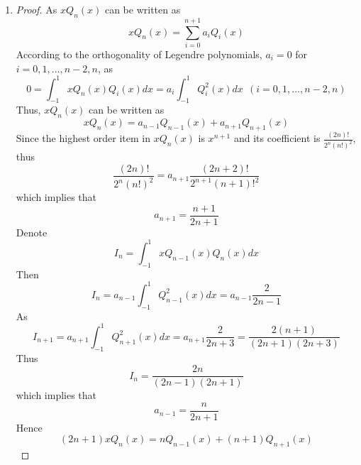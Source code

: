 \documentclass[paper=a4, fontsize=11pt]{scrartcl} %
\numberwithin{equation}{section} %
\numberwithin{figure}{section} %
\numberwithin{table}{section} %
\begin{document}
\begin{enumerate}
		\item
			\begin{proof}
				As $xQ_n(x)$ can be written as
				\begin{equation}
					xQ_n(x) = \sum_{i=0}^{n+1} a_i Q_i(x)
				\end{equation}
				According to the orthogonality of Legendre polynomials, $a_i = 0$ for $i = 0, 1, ... , n-2, n$, as
				\begin{equation}
					0 = \int_{-1}^{1}xQ_n(x) Q_i(x) dx = a_i \int_{-1}^{1}Q_i^2(x)dx \ \ (i = 0, 1, ... , n-2, n)
				\end{equation}
				Thus,  $xQ_n(x)$ can be written as
				\begin{equation}
					xQ_n(x) = a_{n-1} Q_{n-1}(x) + a_{n+1} Q_{n+1}(x)
				\end{equation}
				Since the highest order item in $xQ_n(x)$ is $x^{n+1}$ and its coefficient is $\frac{(2n)!}{2^n (n!)^2}$, thus
				\begin{equation}
					\frac{(2n)!}{2^n (n!)^2} = a_{n+1} \frac{(2n+2)!}{2^{n+1} (n+1)!^2}
				\end{equation}
				which implies that
				\begin{equation}
					a_{n+1} = \frac{n+1}{2n+1} 
				\end{equation}
				Denote
				\begin{equation}
					I_n = \int_{-1}^{1} xQ_{n-1}(x)Q_{n}(x)dx
 				\end{equation}
 				Then
 				\begin{equation}
 					I_n = a_{n-1}\int_{-1}^{1} Q_{n-1}^2(x)dx = a_{n-1} \frac{2}{2n-1}
 				\end{equation}
 				As
 				\begin{equation}
 					I_{n+1} = a_{n+1}\int_{-1}^{1}Q_{n+1}^2(x)dx = a_{n+1} \frac{2}{2n+3} = \frac{2(n+1)}{(2n+1)(2n+3)}
 				\end{equation}
 				Thus
 				\begin{equation}
 					I_n = \frac{2n}{(2n-1)(2n+1)}
 				\end{equation}
 				which implies that
 				\begin{equation}
 					a_{n-1} = \frac{n}{2n+1}
 				\end{equation}
 				Hence
 				\begin{equation}
 					(2n+1)xQ_n(x) = nQ_{n-1}(x) + (n+1)Q_{n+1}(x)
 				\end{equation}
			\end{proof}
			

\end{enumerate}
\end{document}
